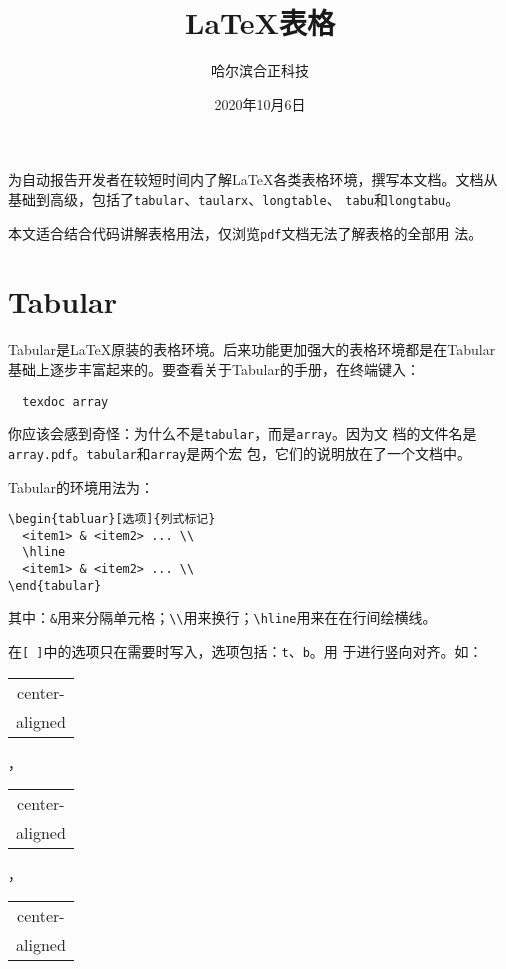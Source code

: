 \documentclass{article}
\title{\LaTeX{}表格}
\author{哈尔滨合正科技}
\date{2020年10月6日}
\begin{document}
\maketitle

为自动报告开发者在较短时间内了解\LaTeX{}各类表格环境，撰写本文档。文档从
基础到高级，包括了\texttt{tabular}、\texttt{taularx}、\texttt{longtable}、
\texttt{tabu}和\texttt{longtabu}。

本文适合结合代码讲解表格用法，仅浏览\texttt{pdf}文档无法了解表格的全部用
法。

\section{Tabular}

Tabular是\LaTeX{}原装的表格环境。后来功能更加强大的表格环境都是在Tabular
基础上逐步丰富起来的。要查看关于Tabular的手册，在终端键入：

\begin{verbatim}
  texdoc array
\end{verbatim}

你应该会感到奇怪：为什么不是\texttt{tabular}，而是\texttt{array}。因为文
档的文件名是\texttt{array.pdf}。\texttt{tabular}和\texttt{array}是两个宏
包，它们的说明放在了一个文档中。

Tabular的环境用法为：

\begin{verbatim}
\begin{tabluar}[选项]{列式标记}
  <item1> & <item2> ... \\
  \hline
  <item1> & <item2> ... \\
\end{tabular}
\end{verbatim}
其中：\verb!&!用来分隔单元格；\verb!\\!用来换行；\verb!\hline!用来在在行间绘横线。

在\verb![ ]!中的选项只在需要时写入，选项包括：\texttt{t}、\texttt{b}。用
于进行竖向对齐。如：

\begin{tabular}{|c|}
center-\\ aligned \\
\end{tabular}
，
\begin{tabular}[t]{|c|}
center-\\ aligned \\
\end{tabular}
，
\begin{tabular}[b]{|c|}
center-\\ aligned \\
\end{tabular}
\end{document}
